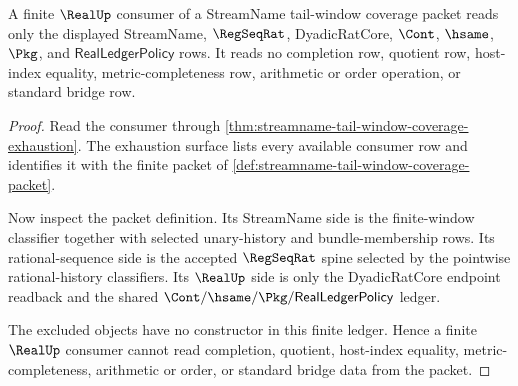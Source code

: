 \begin{theorem}
\label{thm:streamname-tail-window-realup-boundary}
A finite $\RealUp$ consumer of a StreamName tail-window coverage packet reads
only the displayed StreamName, $\RegSeqRat$, DyadicRatCore, $\Cont$, $\hsame$,
$\Pkg$, and $\mathsf{RealLedgerPolicy}$ rows. It reads no completion row,
quotient row, host-index equality, metric-completeness row, arithmetic or
order operation, or standard bridge row.
\end{theorem}
\begin{proof}
Read the consumer through
\autoref{thm:streamname-tail-window-coverage-exhaustion}. The exhaustion
surface lists every available consumer row and identifies it with the finite
packet of \autoref{def:streamname-tail-window-coverage-packet}.

Now inspect the packet definition. Its StreamName side is the finite-window
classifier together with selected unary-history and bundle-membership rows.
Its rational-sequence side is the accepted $\RegSeqRat$ spine selected by the
pointwise rational-history classifiers. Its $\RealUp$ side is only the
DyadicRatCore endpoint readback and the shared
$\Cont/\hsame/\Pkg/\mathsf{RealLedgerPolicy}$ ledger.

The excluded objects have no constructor in this finite ledger. Hence a
finite $\RealUp$ consumer cannot read completion, quotient, host-index
equality, metric-completeness, arithmetic or order, or standard bridge data
from the packet.
\end{proof}

